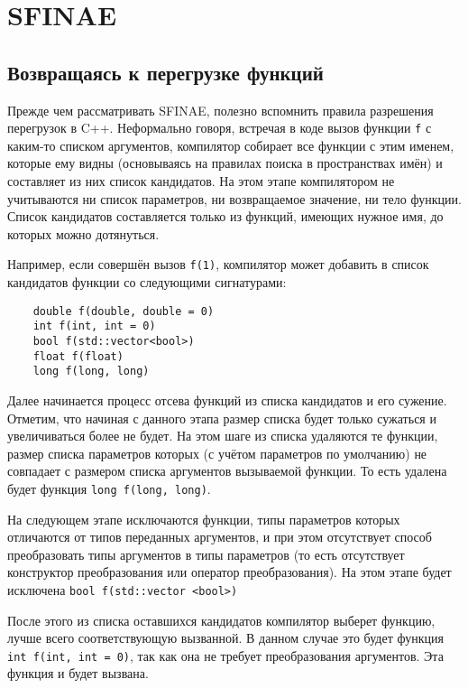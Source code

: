 \section{SFINAE}

\subsection{Возвращаясь к перегрузке функций}

	Прежде чем рассматривать SFINAE, полезно вспомнить правила разрешения перегрузок в C++. Неформально говоря, встречая в коде вызов функции \texttt{f} с каким-то списком аргументов, компилятор собирает все функции с этим именем, которые ему видны (основываясь на правилах поиска в пространствах имён) и составляет из них список кандидатов. На этом этапе компилятором не учитываются ни список параметров, ни возвращаемое значение, ни тело функции. Список кандидатов составляется только из функций, имеющих нужное имя, до которых можно дотянуться.
	
	Например, если совершён вызов \texttt{f(1)}, компилятор может добавить в список кандидатов функции со следующими сигнатурами:
	
	\begin{verbatim}
	double f(double, double = 0)
	int f(int, int = 0)
	bool f(std::vector<bool>)
	float f(float)
	long f(long, long)
	\end{verbatim}
	
	Далее начинается процесс отсева функций из списка кандидатов и его сужение. Отметим, что начиная с данного этапа размер списка будет только сужаться и увеличиваться более не будет. На этом шаге из списка удаляются те функции, размер списка параметров которых (с учётом параметров по умолчанию) не совпадает с размером списка аргументов вызываемой функции. То есть удалена будет функция \texttt{long f(long, long)}.
	
	На следующем этапе исключаются функции, типы параметров которых отличаются от типов переданных аргументов, и при этом отсутствует способ преобразовать типы аргументов в типы параметров (то есть отсутствует конструктор преобразования или оператор преобразования). На этом этапе будет исключена \texttt{bool f(std::vector <bool>)}
	
	После этого из списка оставшихся кандидатов компилятор выберет функцию, лучше всего соответствующую вызванной. В данном случае это будет функция 
\texttt{int f(int, int = 0)}, так как она не требует преобразования аргументов. Эта функция и будет вызвана. 

